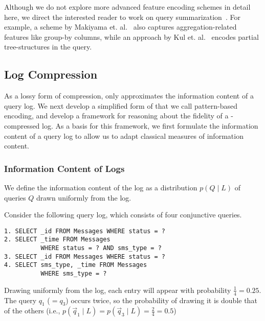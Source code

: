 
Although we do not explore more advanced feature encoding schemes in detail here, we direct the interested reader to work on query summarization~\cite{DBLP:conf/simbig/MakiyamaRS15,DBLP:conf/adbis/AouicheJD06,DBLP:conf/www/KulLXCCKU16}.
For example, a scheme by Makiyama et. al.~\cite{DBLP:conf/simbig/MakiyamaRS15} also captures aggregation-related features like group-by columns, while an approach by Kul et. al.~\cite{DBLP:conf/www/KulLXCCKU16} encodes partial tree-structures in the query. 

\pagebreak

\subsection{Log Compression}
\label{queryrepresentation}

As a lossy form of compression, \systemname only approximates the information content of a query log.
We next develop a simplified form of \systemname that we call pattern-based encoding, and develop a framework for reasoning about the fidelity of a \systemname-compressed log.
As a basis for this framework, we first formulate the information content of a query log to allow us to adapt classical measures of information content.

\subsubsection{Information Content of Logs}
\label{sec:informationcontentoflogs}

We define the information content of the log as a distribution $p(Q\;|\;L)$ of queries $Q$ drawn uniformly from the log.

\begin{example}
\label{distributionExample}
Consider the following query log, which consists of four conjunctive queries.
\begin{lstlisting}
1. SELECT _id FROM Messages WHERE status = ?
2. SELECT _time FROM Messages 
          WHERE status = ? AND sms_type = ?
3. SELECT _id FROM Messages WHERE status = ?
4. SELECT sms_type, _time FROM Messages 
          WHERE sms_type = ?
\end{lstlisting}
Drawing uniformly from the log, each entry will appear with probability $\frac{1}{4} = 0.25$.
The query $q_1$ ($=q_3$) occurs twice, so the probability of drawing it is double that of the others (i.e., $p(\vec{q}_1\;|\;L) = p(\vec{q}_3\;|\;L) = \frac{2}{4} = 0.5$)
\end{example}

